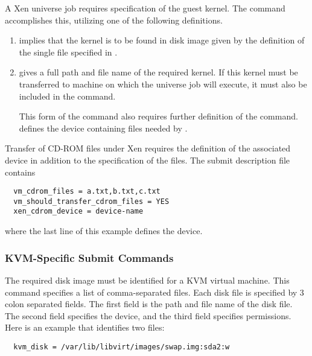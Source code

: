 A Xen  universe job requires specification of the
guest kernel. 
The  command accomplishes this, 
utilizing one of the following definitions.
\begin{enumerate}
\item {} implies that the kernel
  is to be found in disk image given by the definition of the single file
  specified in . 

\item {} gives a full path and
  file name of the required kernel.  If this kernel must be transferred
  to machine on which the  universe job will execute,
  it must also be included in the  command. 

  This form of the  command also requires further
  definition of the  command.
   defines the device containing files needed by
  .

\end{enumerate}

Transfer of CD-ROM files under Xen requires the definition of
the associated device in addition to the specification of the
files.
The submit description file contains
\begin{verbatim}
  vm_cdrom_files = a.txt,b.txt,c.txt
  vm_should_transfer_cdrom_files = YES
  xen_cdrom_device = device-name
\end{verbatim}
where the last line of this example defines the device.

\subsubsection{\label{sec:vm-KVMsubmitfile}KVM-Specific Submit Commands}

The required disk image must be identified for a KVM virtual machine.
This  command specifies a list of comma-separated files.
Each disk file is specified by 3 colon separated fields.
The first field is the path and file name of the disk file.
The second field specifies the device,
and the third field specifies permissions.
Here is an example that identifies two files:
\footnotesize
\begin{verbatim}
  kvm_disk = /var/lib/libvirt/images/swap.img:sda2:w
\end{verbatim}
\normalsize

